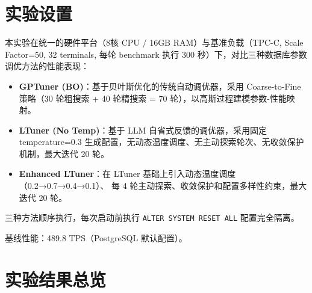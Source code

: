 

\section{实验设置}

本实验在统一的硬件平台（8核 CPU / 16GB RAM）与基准负载（TPC-C, Scale Factor=50,
32 terminals, 每轮 benchmark 执行 300 秒）下，对比三种数据库参数调优方法的性能表现：

\begin{itemize}
  \item \textbf{GPTuner (BO)}：基于贝叶斯优化的传统自动调优器，采用 Coarse-to-Fine
        策略（30 轮粗搜索 + 40 轮精搜索 = 70 轮），以高斯过程建模参数-性能映射。
  \item \textbf{LTuner (No Temp)}：基于 LLM 自省式反馈的调优器，采用固定 temperature=0.3
        生成配置，无动态温度调度、无主动探索轮次、无收敛保护机制，最大迭代 20 轮。
  \item \textbf{Enhanced LTuner}：在 LTuner 基础上引入动态温度调度（0.2→0.7→0.4→0.1）、
        每 4 轮主动探索、收敛保护和配置多样性约束，最大迭代 20 轮。
\end{itemize}

三种方法顺序执行，每次启动前执行 \texttt{ALTER SYSTEM RESET ALL} 配置完全隔离。

基线性能：489.8 TPS（PostgreSQL 默认配置）。



\section{实验结果总览}

